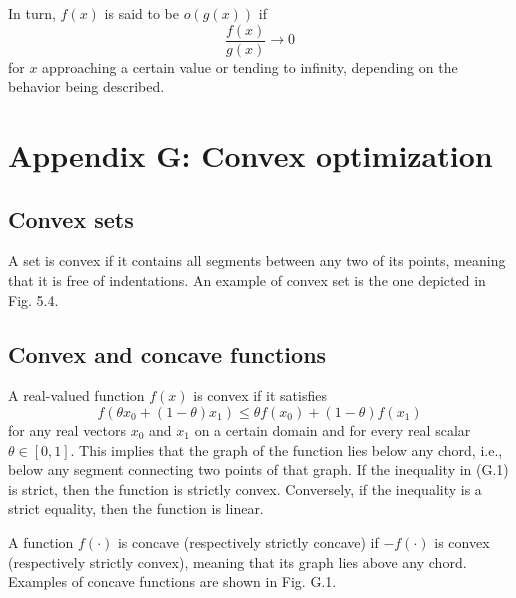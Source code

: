 \documentclass[a4paper, 12pt]{book}
\begin{document}
In turn, $f(x)$ is said to be $o(g(x))$ if
\begin{equation}
    \frac{f(x)}{g(x)}\rightarrow0 \tag{F.2}
\end{equation}
for $x$ approaching a certain value or tending to infinity, depending on the behavior being described.

\setcounter{chapter}{7}
\setcounter{section}{0}
\chapter*{Appendix G: Convex optimization}

\section{Convex sets}
A set is convex if it contains all segments between any two of its points, meaning that it is free of indentations. An example of convex set is the one depicted in Fig. 5.4.

\section{Convex and concave functions}
A real-valued function $f(x)$ is convex if it satisfies
\begin{equation}
    f(\theta x_{0}+(1-\theta)x_{1})\le\theta f(x_{0})+(1-\theta)f(x_{1}) \tag{G.1}
\end{equation}
for any real vectors $x_{0}$ and $x_{1}$ on a certain domain and for every real scalar $\theta\in[0,1]$. This implies that the graph of the function lies below any chord, i.e., below any segment connecting two points of that graph. If the inequality in (G.1) is strict, then the function is strictly convex. Conversely, if the inequality is a strict equality, then the function is linear.

A function $f(\cdot)$ is concave (respectively strictly concave) if $-f(\cdot)$ is convex (respectively strictly convex), meaning that its graph lies above any chord. Examples of concave functions are shown in Fig. G.1.

\begin{center}
\end{center}
\end{document}
